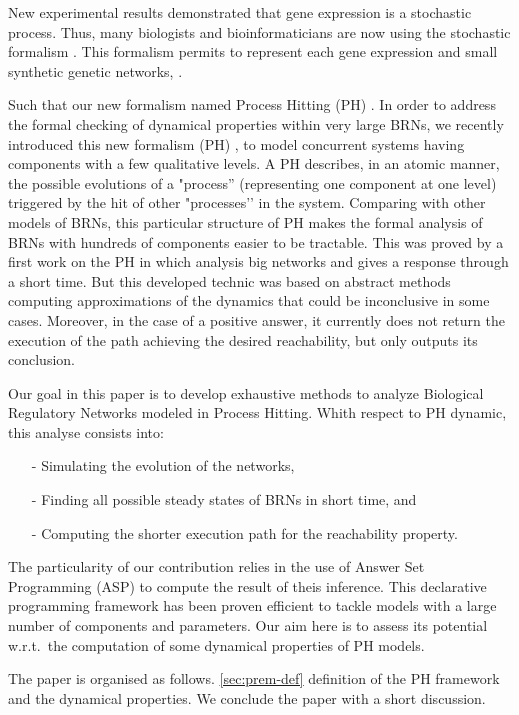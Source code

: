 New experimental results \cite{elowitz2002stochastic} \cite{blake2003noise} demonstrated that gene expression is a stochastic process. Thus, many biologists and bioinformaticians are now using the stochastic formalism \cite{arkin1998stochastic, tian2006stochastic, wang2010robust}. This formalism permits to represent each gene expression \cite{raser2005noise} and small synthetic genetic networks, \cite{elowitz2000synthetic} \cite{gardner2000construction}.

 Such that our new formalism named Process Hitting (PH) \cite{PMR10-TCSB}. In order to address the formal checking of dynamical properties within very large BRNs, we recently introduced this new formalism (PH) \cite{PMR10-TCSB}, to model concurrent systems having components with a few qualitative levels. A PH describes, in an atomic manner, the possible evolutions of a "process'' (representing one component at one level) triggered by the hit of other "processes’’ in the system. Comparing with other models of BRNs, this particular structure of PH makes the formal analysis of BRNs with hundreds of components easier to be tractable. This was proved by a first work on the PH in \cite{PMR10-TCSB,PMR12-MSCS} which analysis big networks and gives a response through a short time. But this developed technic was based on abstract methods computing approximations of the dynamics that could be inconclusive in some cases. Moreover, in the case of a positive answer, it currently does not return the execution of the path achieving the desired reachability, but only outputs its conclusion.

Our goal in this paper is to develop exhaustive methods to analyze Biological Regulatory Networks modeled in Process Hitting. Whith respect to PH dynamic, this analyse consists into:
\begin{itemize}
\item[-] Simulating the evolution of the networks,
\item[-] Finding all possible steady states of BRNs in short time, and
\item[-] Computing the shorter execution path for the reachability property.
\end{itemize}

 The particularity of our contribution relies in the use of Answer Set Programming
(ASP) \cite{baral2003knowledge}
to compute the result of theis inference.
This declarative programming framework has been proven efficient
to tackle models with a large number of components and parameters.
Our aim here is to assess its potential w.r.t.\ the computation
of some dynamical properties of PH models.

The paper is organised as follows. \ref{sec:prem-def} definition of the PH framework and the dynamical properties. %
We conclude the paper with a short discussion. 